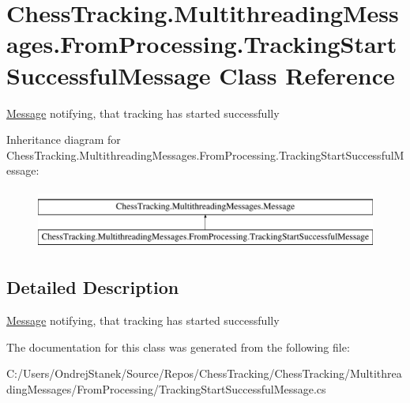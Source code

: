 \hypertarget{class_chess_tracking_1_1_multithreading_messages_1_1_from_processing_1_1_tracking_start_successful_message}{}\section{Chess\+Tracking.\+Multithreading\+Messages.\+From\+Processing.\+Tracking\+Start\+Successful\+Message Class Reference}
\label{class_chess_tracking_1_1_multithreading_messages_1_1_from_processing_1_1_tracking_start_successful_message}


\mbox{\hyperlink{class_chess_tracking_1_1_multithreading_messages_1_1_message}{Message}} notifying, that tracking has started successfully  


Inheritance diagram for Chess\+Tracking.\+Multithreading\+Messages.\+From\+Processing.\+Tracking\+Start\+Successful\+Message\+:\begin{figure}[H]
\begin{center}
\leavevmode
\includegraphics[height=2.000000cm]{class_chess_tracking_1_1_multithreading_messages_1_1_from_processing_1_1_tracking_start_successful_message}
\end{center}
\end{figure}


\subsection{Detailed Description}
\mbox{\hyperlink{class_chess_tracking_1_1_multithreading_messages_1_1_message}{Message}} notifying, that tracking has started successfully 



The documentation for this class was generated from the following file\+:\begin{DoxyCompactItemize}
\item 
C\+:/\+Users/\+Ondrej\+Stanek/\+Source/\+Repos/\+Chess\+Tracking/\+Chess\+Tracking/\+Multithreading\+Messages/\+From\+Processing/Tracking\+Start\+Successful\+Message.\+cs\end{DoxyCompactItemize}
